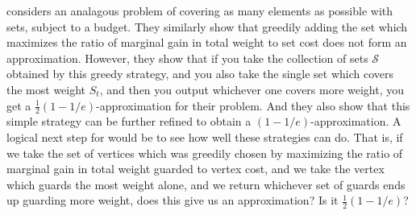 \cite{khuller} considers an analagous problem of covering as many elements as possible with sets, subject to a budget. They similarly show that greedily adding the set which maximizes the ratio of marginal gain in total weight to set cost does not form an approximation. However, they show that if you take the collection of sets $\mathcal{S}$ obtained by this greedy strategy, and you also take the single set which covers the most weight $S_t$, and then you output whichever one covers more weight, you get a $\frac{1}{2}(1-1/e)$-approximation for their problem. And they also show that this simple strategy can be further refined to obtain a $(1-1/e)$-approximation. A logical next step for \BMVVG{} would be to see how well these strategies can do. That is, if we take the set of vertices which was greedily chosen by maximizing the ratio of marginal gain in total weight guarded to vertex cost, and we take the vertex which guards the most weight alone, and we return whichever set of guards ends up guarding more weight, does this give us an approximation? Is it $\frac{1}{2}(1-1/e)$?




